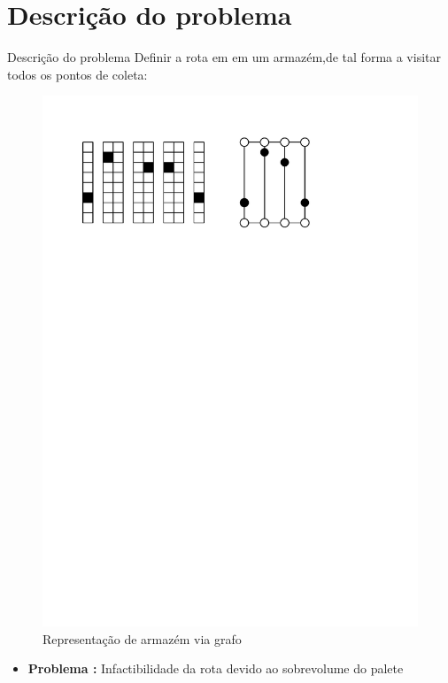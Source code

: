 \documentclass[12pt]{beamer}
\begin{document}
\section{Descri\c{c}\~ao do problema}
	\begin{frame}{Descri\c{c}\~ao do problema}
		Definir a rota em em um armaz\'em,de tal forma a visitar todos os pontos de coleta:
			\begin{figure}
			\pause
			\includegraphics[width=1\linewidth]{CD_1}
			\caption{Representa\c{c}\~ao de armaz\'em via grafo}
			
		\end{figure}
	\pause
	\begin{itemize}
		\item {\bfseries Problema :}
		Infactibilidade da rota devido ao sobrevolume do palete
	\end{itemize}
	\end{frame}
\end{document}
